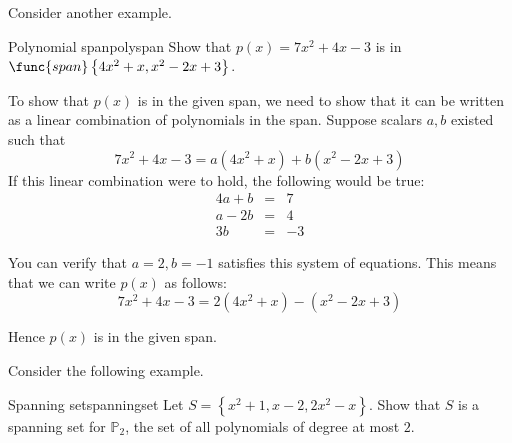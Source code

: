 Consider another example. 

\begin{example}{Polynomial span}{polyspan}
Show that $p(x) = 7x^2 + 4x - 3$ is in $\func{span}\left\{ 4x^2 + x, x^2 -2x + 3 \right\}$. 
\end{example}

\begin{solution}
To show that $p(x)$ is in the given span, we need to show that it can be written as a linear combination of polynomials in the span. Suppose scalars $a, b$ existed such that 
\[
7x^2 +4x - 3= a(4x^2+x) + b (x^2-2x+3) 
\]
If this linear combination were to hold, the following would be true:
\begin{eqnarray*}
4a + b &=& 7 \\
a - 2b &=& 4 \\
3b &=& -3 
\end{eqnarray*}

You can verify that $a = 2, b = -1$ satisfies this system of equations. This means that we can write $p(x)$ as follows:
\[
 7x^2 +4x-3= 2(4x^2+x)  - (x^2-2x+3) 
\]

Hence $p(x)$ is in the given span.
\end{solution}

Consider the following example.

\begin{example}{Spanning set}{spanningset}
Let $S = \left\{ x^2 + 1, x-2, 2x^2 - x \right\}$. Show that $S$ is a spanning set for $\mathbb{P}_2$, the set of all polynomials of degree at most $2$. 
\end{example}

